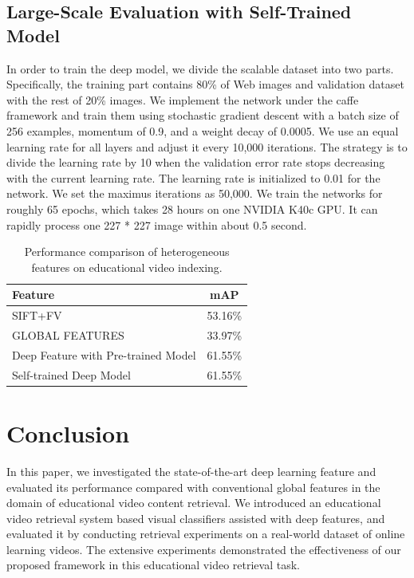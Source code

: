 \documentclass[11pt,twocolumn,twoside]{IEEEtran}
\begin{document}
\subsection{Large-Scale Evaluation with Self-Trained Model}
In order to train the deep model, we divide the scalable dataset into two parts. Specifically, the training part contains 80\% of Web images and validation dataset with the rest of 20\% images.
We implement the network under the caffe framework \cite{CAFFE} and train them using stochastic gradient descent with a batch size of 256 examples, momentum of 0.9, and
a weight decay of 0.0005. We use an equal learning rate for all layers and adjust it every 10,000 iterations. The strategy is to divide the learning rate by 10 when the validation error rate
stops decreasing with the current learning rate. The learning rate is initialized to 0.01 for the network. We set the maximus iterations as 50,000.
We train the networks for roughly 65 epochs, which takes 28 hours on one NVIDIA K40c GPU. It can rapidly process one 227 * 227 image within about 0.5 second.

\begin{table}\scriptsize
\centering
\begin{tabular}{|l||c|}
\hline
Feature              & mAP    \\
\hline\hline
SIFT+FV                 & 53.16\%   \\
\hline
GLOBAL FEATURES                   & 33.97\%   \\
\hline
Deep Feature with Pre-trained Model &  61.55\%  \\
\hline
\hline
Self-trained Deep Model   &  61.55\% \\
\hline
\end{tabular}
\caption{Performance comparison of heterogeneous features on educational video indexing. }
\label{tb:combination}
\end{table}




\section{Conclusion}
In this paper, we investigated the state-of-the-art deep learning feature and evaluated its performance compared with conventional global features in the domain of educational video content retrieval.
We introduced an educational video retrieval system based visual classifiers
assisted with deep features, and evaluated it by conducting retrieval experiments on a real-world dataset of online learning videos.
The extensive experiments demonstrated the effectiveness of our
proposed framework in this educational video retrieval task.
\end{document}
